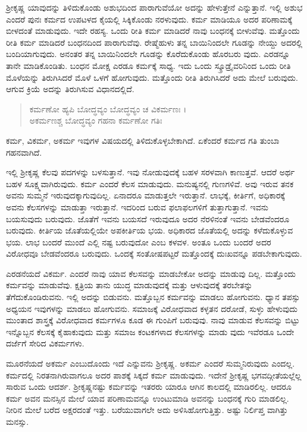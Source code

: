 ಶ್ರೀಕೃಷ್ಣ ಯಾವುದನ್ನು ತಿಳಿದುಕೊಂಡು ಅಶುಭದಿಂದ ಪಾರಾಗುವೆಯೋ ಅದನ್ನು ಹೇಳುತ್ತೇನೆ ಎನ್ನುತ್ತಾನೆ. ಇಲ್ಲಿ ಅಶುಭ ಎಂದರೆ ಪುನಃ ಕರ್ಮದ ಉಪಟಳದ ಕೈಯಲ್ಲಿ ಸಿಕ್ಕಿಕೊಂಡು ನರಳುವುದು. ಕರ್ಮ ಮಾಡಿಯೂ ಅದರ ಪರಿಣಾಮಕ್ಕೆ ಬೀಳದಂತೆ ಮಾಡುವುದು. ಇದೇ ರಹಸ್ಯ. ಒಂದು ರೀತಿ ಕರ್ಮ ಮಾಡಿದರೆ ನಾವು ಬಂಧನಕ್ಕೆ ಬೀಳುವೆವು. ಮತ್ತೊಂದು ರೀತಿ ಕರ್ಮ ಮಾಡಿದರೆ ಬಂಧನದಿಂದ ಪಾರಾಗುವೆವು. ರೇಷ್ಮೆಹುಳು ತನ್ನ ಬಾಯಿನಿಂದಲೇ ಗೂಡನ್ನು ನೇಯ್ದು ಅದರಲ್ಲಿ ಬಂದಿಯಾಗುವುದು. ಅನಂತರ ತನ್ನ ಬಾಯಿನಿಂದಲೇ ಗೂಡನ್ನು ಕೊರೆದುಕೊಂಡು ಹೊರಬರು ವುದು. ಎರಡನ್ನೂ ತಾನೇ ಮಾಡಿಕೊಂಡಿತು. ಬಂಧನ ಮೋಕ್ಷ ಎರಡೂ ಕರ್ಮಕ್ಕೆ ಸಾಧ್ಯ. ಇದು ಒಂದು ಸ್ಕ್ರೂಡ್ರೈವರಿನಿಂದ ಒಂದು ರೀತಿ ಮೊಳೆಯನ್ನು ತಿರುಗಿಸಿದರೆ ಮೊಳೆ ಒಳಗೆ ಹೋಗುವುದು. ಮತ್ತೊಂದು ರೀತಿ ತಿರುಗಿಸಿದರೆ ಅದು ಮೇಲೆ ಬರುವುದು. ಆಗುವ ಕ್ರಿಯೆ ಅದನ್ನು ತಿರುಗಿಸುವ ವಿಧಾನದಲ್ಲಿದೆ.

\begin{verse}
ಕರ್ಮಣೋ ಹ್ಯಪಿ ಬೋದ್ಧವ್ಯಂ ಬೋದ್ಧವ್ಯಂ ಚ ವಿಕರ್ಮಣಃ ।\\ಅಕರ್ಮಣಶ್ಚ ಬೋದ್ಧವ್ಯಂ ಗಹನಾ ಕರ್ಮಣೋ ಗತಿಃ 
\end{verse}

{\small ಕರ್ಮ, ವಿಕರ್ಮ, ಅಕರ್ಮ ಇವುಗಳ ವಿಷಯದಲ್ಲಿ ತಿಳಿದುಕೊಳ್ಳಬೇಕಾಗಿದೆ. ಏಕೆಂದರೆ ಕರ್ಮದ ಗತಿ ತುಂಬಾ ಗಹನವಾಗಿದೆ.}

ಇಲ್ಲಿ ಶ್ರೀಕೃಷ್ಣ ಕೆಲವು ಪದಗಳನ್ನು ಬಳಸುತ್ತಾನೆ. ಇವು ನೋಡುವುದಕ್ಕೆ ಬಹಳ ಸರಳವಾಗಿ ಕಾಣುತ್ತವೆ. ಆದರೆ ಅರ್ಥ ಬಹಳ ಸೂಕ್ಷ್ಮವಾಗಿರುವುದು. ಕರ್ಮ ಎಂದರೆ ಕೆಲಸ ಮಾಡುವುದು. ಮನುಷ್ಯನಲ್ಲಿ ಗುಣಗಳಿವೆ. ಅವು ಇರುವ ತನಕ ಅವನು ಸುಮ್ಮನೆ ಇರುವುದಕ್ಕಾಗುವುದಿಲ್ಲ. ಏನಾದರೂ ಮಾಡುತ್ತಲೇ ಇರುತ್ತಾನೆ. ಲಾಭಕ್ಕೆ, ಕೀರ್ತಿಗೆ, ಅಧಿಕಾರಕ್ಕೆ ಅವನು ಕೆಲಸಗಳನ್ನು ಮಾಡುತ್ತಾ ಇರುತ್ತಾನೆ. ಇದರಿಂದ ಬರುವ ಫಲಾಫಲಗಳಿಗೆ ತುತ್ತಾಗುತ್ತಾನೆ. ಇವನು ಬಯಸುವುದು ಬರುವುದು. ಜೊತೆಗೆ ಇವನು ಬಯಸದೆ ಇರುವುದೂ ಅದರ ನೆರಳಿನಂತೆ ಇವನು ಬೇಡವೆಂದರೂ ಬರುವುದು. ಕೀರ್ತಿಯ ಜೊತೆಯಲ್ಲಿಯೇ ಅಪಕೀರ್ತಿಯ ಭಯ. ಅಧಿಕಾರದ ಜೊತೆಯಲ್ಲಿ ಅದನ್ನು ಕಳೆದುಕೊಳ್ಳುವ ಭಯ. ಲಾಭ ಬಂದರೆ ಮುಂದೆ ಎಲ್ಲಿ ನಷ್ಟ ಬರುವುದೋ ಎಂಬ ಕಳವಳ. ಅಂತೂ ಒಂದು ಬಂದರೆ ಅದರ ವಿರೋಧವೂ ಬೇಡವೆಂದರೂ ಬರುವುದು. ಒಂದಕ್ಕೆ ಸಂತೋಷಪಟ್ಟರೆ ಮತ್ತೊಂದಕ್ಕೆ ದುಃಖವನ್ನೂ ಪಡಬೇಕಾಗುವುದು.

ಎರಡನೆಯದೆ ವಿಕರ್ಮ. ಎಂದರೆ ನಾವು ಯಾವ ಕೆಲಸವನ್ನು ಮಾಡಬೇಕೋ ಅದನ್ನು ಮಾಡುವು ದಿಲ್ಲ. ಮತ್ತೊಂದು ಕರ್ಮವನ್ನು ಮಾಡುವೆವು. ಕ್ಷತ್ರಿಯ ತಾನು ಯುದ್ಧ ಮಾಡುವುದಕ್ಕೆ ಮತ್ತು ಆಳುವುದಕ್ಕೆ ತರಬೇತನ್ನು ತೆಗೆದುಕೊಂಡಿರುವನು. ಇಲ್ಲಿ ಅದನ್ನು ಬಿಡುವನು. ಮತ್ತೊಬ್ಬನ ಕರ್ಮವನ್ನು ಮಾಡಲು ಹೋಗುವನು. ಧ್ಯಾನ ತಪಸ್ಸು ಅಧ್ಯಯನ ಇವುಗಳನ್ನು ಮಾಡಲು ಹೋಗುವನು. ಸಮಾಜಕ್ಕೆ ವಿರೋಧವಾದ ಕಳ್ಳತನ ದರೋಡೆ, ಸುಳ್ಳು ಹೇಳುವುದು ಮುಂತಾದ ಶಾಸ್ತ್ರಕ್ಕೆ ವಿರೋಧವಾದ ಕರ್ಮಗಳೂ ಕೂಡ ಈ ಗುಂಪಿಗೆ ಬರುವುವು. ನಾವು ಮಾಡುವ ಕೆಲಸವನ್ನು ಬಿಟ್ಟು ಇನ್ನೊಬ್ಬನ ಕೆಲಸಕ್ಕೆ ಕೈಹಾಕುವುದು ಮತ್ತು ಸಮಾಜ ಕಂಟಕಗಳಾದ ಕೆಲಸಗಳನ್ನು ಮಾಡು ವುದು ಇವೆರಡೂ ಒಂದೇ ದರ್ಜೆಗೆ ಸೇರಿದ ವಿಕರ್ಮಗಳು.

ಮೂರನೆಯದೆ ಅಕರ್ಮ ಎಂಬುದೊಂದು ಇದೆ ಎನ್ನುವನು ಶ್ರೀಕೃಷ್ಣ. ಅಕರ್ಮ ಎಂದರೆ ಸುಮ್ಮನಿರುವುದು ಎಂದಲ್ಲ. ಕರ್ಮದಲ್ಲಿ ನಿರತನಾಗಿರುವಾಗಲೂ ಅದರ ಪಾಶಕ್ಕೆ ಸಿಕ್ಕದೆ ಕರ್ಮ ಮಾಡುವುದು. ಇದೇನೆ ಶ್ರೀಕೃಷ್ಣ ಭಗವದ್ಗೀತೆಯಲ್ಲೆಲ್ಲ ಸಾರುವ ಒಂದು ಆದರ್ಶ. ಶ್ರೀಕೃಷ್ಣನಷ್ಟು ಕರ್ಮವನ್ನು ಇತರರು ಯಾರೂ ಆಗಿನ ಕಾಲದಲ್ಲಿ ಮಾಡಿರಲಿಲ್ಲ. ಆದರೂ ಕರ್ಮ ಅವನ ಮನಸ್ಸಿನ ಮೇಲೆ ಯಾವ ಪರಿಣಾಮವನ್ನೂ ಉಂಟುಮಾಡಿ ಅವನನ್ನು ಬಂಧನಕ್ಕೆ ಗುರಿ ಮಾಡಲಿಲ್ಲ. ನೀರಿನ ಮೇಲೆ ಬರೆದ ಅಕ್ಷರದಂತೆ ಇತ್ತು. ಬರೆಯುವಾಗಲೇ ಅದು ಅಳಿಸಿಹೋಗುತ್ತಿತ್ತು. ಅಷ್ಟು ನಿರ್ಲಿಪ್ತ ವಾಗಿತ್ತು ಮನಸ್ಸು.

